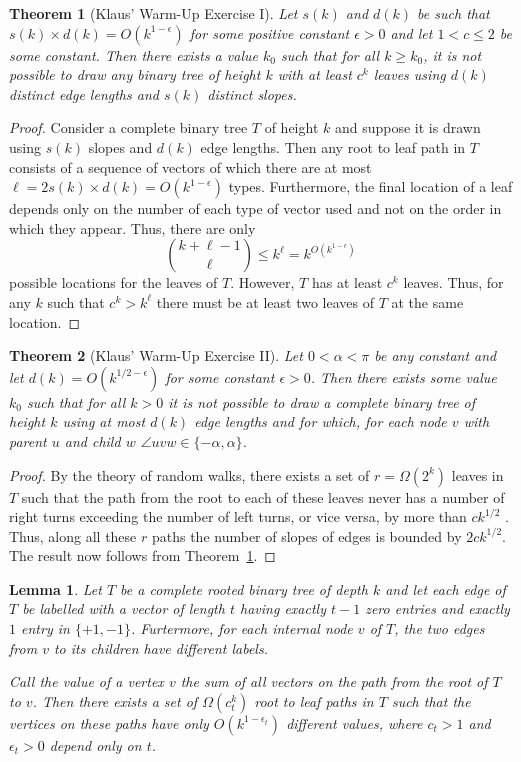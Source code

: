\documentclass{article}
\newtheorem{lem}{Lemma}
\newtheorem{thm}{Theorem}
\begin{document}
\begin{thm}[Klaus' Warm-Up Exercise I]\label{thm:klaus1}
Let $s(k)$ and $d(k)$ be such that $s(k)\times d(k)=O(k^{1-\epsilon})$
for some positive constant $\epsilon > 0$ and let $1<c\le 2$ be some
constant.  Then there exists a value
$k_0$ such that for all $k\ge k_0$, it is not possible to draw any
binary tree of height $k$ with at least $c^k$ leaves
using $d(k)$ distinct edge lengths and
$s(k)$ distinct slopes.
\end{thm}

\begin{proof}
Consider a complete binary tree $T$ of height $k$ and suppose it is
drawn using $s(k)$ slopes and $d(k)$ edge lengths.  Then any root to
leaf path in $T$ consists of a sequence of vectors of which there are
at most $\ell=2s(k)\times d(k)=O(k^{1-\epsilon})$ types.  Furthermore,
the final location of a leaf depends only on the number of each type
of vector used and not on the order in which they appear.  Thus, there
are only 
\[
           {k+\ell-1 \choose \ell} \le k^\ell = k^{O(k^{1-\epsilon})}
\]
possible locations for the leaves of $T$.  However, $T$
has at least $c^k$ leaves.  Thus, for any $k$ such that $c^k> k^\ell$ there
must be at least two leaves of $T$ at the same location.
\end{proof}

\begin{thm}[Klaus' Warm-Up Exercise II]\label{thm:klaus2}
Let $0<\alpha<\pi$ be any constant and let $d(k)=O(k^{1/2-\epsilon})$
for some constant $\epsilon > 0$.  Then there exists some 
value $k_0$ such that for all $k> 0$ it is not possible to draw a
complete binary tree of height $k$ using at most $d(k)$ edge lengths
and for which, for each node $v$ with parent $u$ and child $w$ $\angle
uvw\in\{-\alpha,\alpha\}$.
\end{thm}

\newcommand{\rwlen}{ck^{1/2}}

\begin{proof}
By the theory of random walks, there exists a set of $r=\Omega(2^{k})$
leaves in $T$ such that the path from the root to each of these leaves
never has a number of right turns exceeding the number of left turns,
or vice versa, by more than $\rwlen$ \cite{X}.  Thus, along all these
$r$ paths the number of slopes of edges is bounded by $2\rwlen$.  The
result now follows from Theorem~\ref{thm:klaus1}.
\end{proof}


\begin{lem}\label{lem:random-walk}
Let $T$ be a complete rooted binary tree of depth $k$ and let each
edge of $T$ be labelled with a vector of length $t$ having exactly
$t-1$ zero entries and exactly $1$ entry in $\{+1,-1\}$.  Furtermore,
for each internal node $v$ of $T$, the two edges from $v$ to its
children have different labels.

Call the \emph{value} of a vertex $v$ the sum of all vectors on the
path from the root of $T$ to $v$.  Then there exists a set of
$\Omega(c_t^k)$ root to leaf paths in $T$ such that the vertices on
these paths have only $O(k^{1-\epsilon_t})$ different values, where
$c_t > 1$ and $\epsilon_t > 0$ depend only on $t$.
\end{lem}
\end{document}
